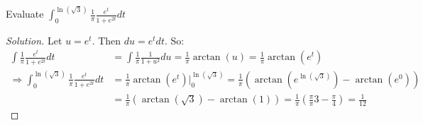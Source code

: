 \documentclass[crop=false,class=book]{standalone}
\begin{document}
\begin{problem}
Evaluate $\int_{0}^{\ln(\sqrt{3})}\frac{1}{\pi}\frac{e^{t}}{1+e^{2t}}dt$
\end{problem}
\begin{proof}[Solution]
Let $u=e^{t}$. Then $du=e^{t}dt$. So:
\begin{align*}
    \int\frac{1}{\pi}\frac{e^{t}}{1+e^{2t}}dt&=\int\frac{1}{\pi}\frac{1}{1+u^{2}}du=\frac{1}{\pi}\arctan(u)=\frac{1}{\pi}\arctan(e^{t})\\
    \Rightarrow\int_{0}^{\ln(\sqrt{3})}\frac{1}{\pi}\frac{e^{t}}{1+e^{2t}}dt&=\frac{1}{\pi}\arctan(e^{t})\big|_{0}^{\ln(\sqrt{3})}=\frac{1}{\pi}(\arctan(e^{\ln(\sqrt{3})})-\arctan(e^{0}))\\
    &=\frac{1}{\pi}(\arctan(\sqrt{3})-\arctan(1))=\frac{1}{\pi}(\frac{\pi}{\pi}{3}-\frac{\pi}{4})=\frac{1}{12}
\end{align*}
\end{proof}
\newpage
\end{document}
